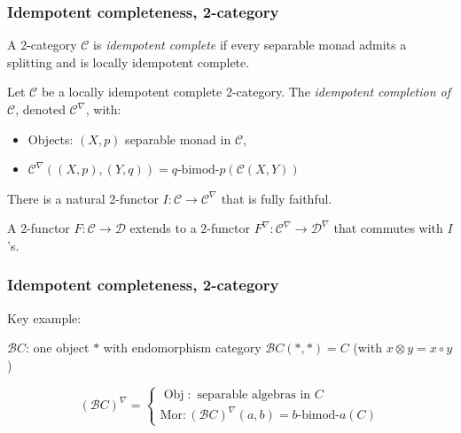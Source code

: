 \documentclass{beamer}
\DeclareMathOperator{\Obj}{Obj}
\newcommand{\cB}{{\mathcal{B}}}
\newcommand{\cC}{{\mathcal{C}}}
\newcommand{\cD}{{\mathcal{D}}}
\newcommand{\bimod}[2]{{#1\textrm{-bimod-}#2}}
\begin{document}
\begin{frame}
\frametitle{Idempotent completeness, 2-category}

\begin{definition}
A 2-category $\cC$ is \emph{idempotent complete}
if every separable monad admits a splitting
and is locally idempotent complete.
\end{definition}

\pause

\begin{definition}
Let $\cC$ be a locally idempotent complete 2-category.
The \emph{idempotent completion of $\cC$},
denoted $\cC^\nabla$, with:
\begin{itemize}
\item Objects: $(X,p)$ separable monad in $\cC$,
\item $\cC^\nabla((X,p),(Y,q)) = \bimod{q}{p}(\cC(X,Y))$
\end{itemize}

\pause

There is a natural 2-functor $I: \cC \to \cC^\nabla$
that is fully faithful.

\pause

A 2-functor $F: \cC \to \cD$
extends to a 2-functor $F^\nabla: \cC^\nabla \to \cD^\nabla$
that commutes with $I$'s.
\end{definition}

\end{frame}

\begin{frame}
\frametitle{Idempotent completeness, 2-category}

Key example:

$\cB C$: one object $*$ with endomorphism category
$\cB C(*,*) = C$
(with $x \otimes y = x \circ y$)

\[
(\cB C)^\nabla =
\begin{cases}
	\Obj: \text{ separable algebras in } C
	\\
	\text{Mor}: (\cB C)^\nabla (a,b) = \bimod{b}{a}(C)
\end{cases}
\]


\end{frame}
\end{document}
